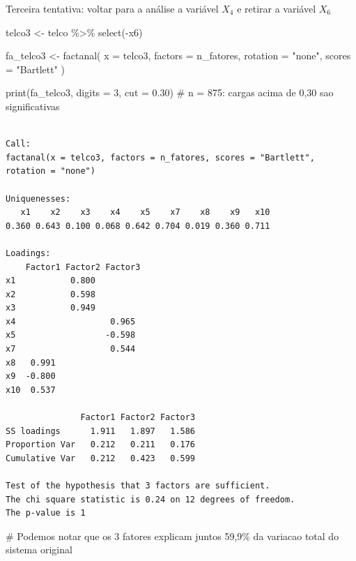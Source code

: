 \documentclass[
  ignorenonframetext,
  aspectratio=169,
]{beamer}
\newenvironment{Shaded}{\begin{snugshade}}{\end{snugshade}}
\newcommand{\AttributeTok}[1]{\textcolor[rgb]{0.40,0.45,0.13}{#1}}
\newcommand{\CommentTok}[1]{\textcolor[rgb]{0.37,0.37,0.37}{#1}}
\newcommand{\DecValTok}[1]{\textcolor[rgb]{0.68,0.00,0.00}{#1}}
\newcommand{\FloatTok}[1]{\textcolor[rgb]{0.68,0.00,0.00}{#1}}
\newcommand{\FunctionTok}[1]{\textcolor[rgb]{0.28,0.35,0.67}{#1}}
\newcommand{\NormalTok}[1]{\textcolor[rgb]{0.00,0.23,0.31}{#1}}
\newcommand{\OtherTok}[1]{\textcolor[rgb]{0.00,0.23,0.31}{#1}}
\newcommand{\SpecialCharTok}[1]{\textcolor[rgb]{0.37,0.37,0.37}{#1}}
\newcommand{\StringTok}[1]{\textcolor[rgb]{0.13,0.47,0.30}{#1}}
\begin{document}
\begin{frame}[fragile]{Terceira tentativa: voltar para a análise a
variável \(X_4\) e retirar a variável \(X_6\)}
\label{terceira-tentativa-voltar-para-a-anuxe1lise-a-variuxe1vel-x_4-e-retirar-a-variuxe1vel-x_6}
\begin{Shaded}
\begin{Highlighting}[]
\NormalTok{telco3 }\OtherTok{\textless{}{-}}\NormalTok{ telco }\SpecialCharTok{\%\textgreater{}\%} \FunctionTok{select}\NormalTok{(}\SpecialCharTok{{-}}\NormalTok{x6)}

\NormalTok{fa\_telco3 }\OtherTok{\textless{}{-}} \FunctionTok{factanal}\NormalTok{(}
  \AttributeTok{x        =}\NormalTok{ telco3,}
  \AttributeTok{factors  =}\NormalTok{ n\_fatores,}
  \AttributeTok{rotation =} \StringTok{"none"}\NormalTok{,}
  \AttributeTok{scores   =} \StringTok{"Bartlett"}
\NormalTok{)}

\FunctionTok{print}\NormalTok{(fa\_telco3, }\AttributeTok{digits =} \DecValTok{3}\NormalTok{, }\AttributeTok{cut =} \FloatTok{0.30}\NormalTok{) }\CommentTok{\# n = 875: cargas acima de 0,30 sao significativas}
\end{Highlighting}
\end{Shaded}

\begin{verbatim}

Call:
factanal(x = telco3, factors = n_fatores, scores = "Bartlett",     rotation = "none")

Uniquenesses:
   x1    x2    x3    x4    x5    x7    x8    x9   x10 
0.360 0.643 0.100 0.068 0.642 0.704 0.019 0.360 0.711 

Loadings:
    Factor1 Factor2 Factor3
x1           0.800         
x2           0.598         
x3           0.949         
x4                   0.965 
x5                  -0.598 
x7                   0.544 
x8   0.991                 
x9  -0.800                 
x10  0.537                 

               Factor1 Factor2 Factor3
SS loadings      1.911   1.897   1.586
Proportion Var   0.212   0.211   0.176
Cumulative Var   0.212   0.423   0.599

Test of the hypothesis that 3 factors are sufficient.
The chi square statistic is 0.24 on 12 degrees of freedom.
The p-value is 1 
\end{verbatim}

\begin{Shaded}
\begin{Highlighting}[]
\CommentTok{\# Podemos notar que os 3 fatores explicam juntos 59,9\% da variacao total do sistema original}
\end{Highlighting}
\end{Shaded}
\end{frame}
\end{document}
